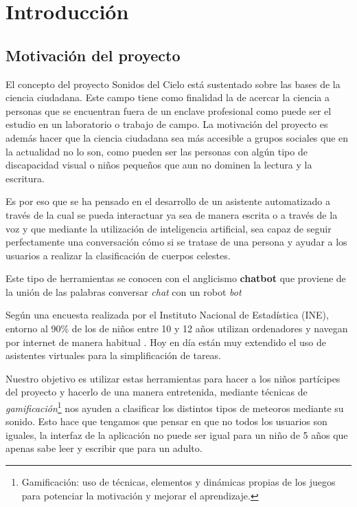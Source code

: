 \chapter{Introducción}
\section{Motivación del proyecto}

El concepto del proyecto Sonidos del Cielo está sustentado sobre las bases de la ciencia ciudadana. Este campo tiene como finalidad la de acercar la ciencia a personas que se encuentran fuera de un enclave profesional como puede ser el estudio en un laboratorio o trabajo de campo. La motivación del proyecto es además hacer que la ciencia ciudadana sea más accesible a grupos sociales que en la actualidad no lo son, como pueden ser las personas con algún tipo de discapacidad visual o niños pequeños que aun no dominen la lectura y la escritura.

Es por eso que se ha pensado en el desarrollo de un asistente automatizado a través de la cual se pueda interactuar ya sea de manera escrita o a través de la voz y que mediante la utilización de inteligencia artificial, sea capaz de seguir perfectamente una conversación cómo si se tratase de una persona y ayudar a los usuarios a realizar la clasificación de cuerpos celestes. 

Este tipo de herramientas se conocen con el anglicismo \textbf{chatbot} que proviene de la unión de las palabras conversar \textit{chat} con un robot \textit{bot}

Según una encuesta realizada por el Instituto Nacional de Estadística (INE), entorno al 90\% de los de niños entre 10 y 12 años utilizan ordenadores y navegan por internet de manera habitual \cite{ine}. Hoy en día están muy extendido el uso de asistentes virtuales para la simplificación de tareas. 

Nuestro objetivo es utilizar estas herramientas para hacer a los niños partícipes del proyecto y hacerlo de una manera entretenida, mediante técnicas de \textit{gamificación}\footnote{Gamificación: uso de técnicas, elementos y dinámicas propias de los juegos para potenciar la motivación y mejorar el aprendizaje.} nos ayuden a clasificar los distintos tipos de meteoros mediante su sonido.
Esto hace que tengamos que pensar en que no todos los usuarios son iguales, la interfaz de la aplicación no puede ser igual para un niño de 5 años que apenas sabe leer y escribir que para un adulto.

